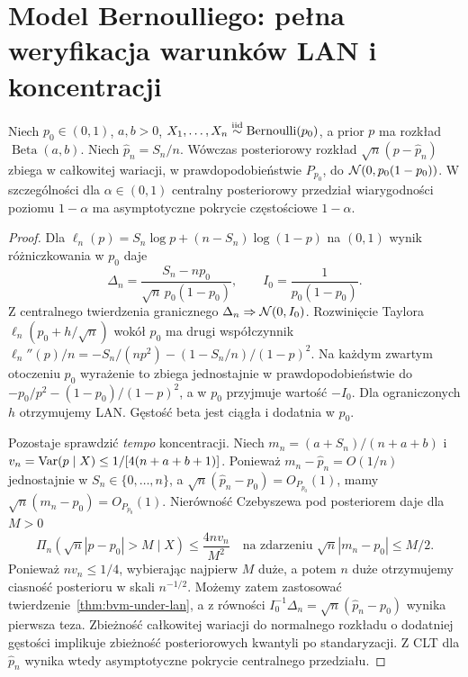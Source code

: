 \section{Model Bernoulliego: pełna weryfikacja warunków LAN i koncentracji}
\begin{twierdzenie}
\label{thm:bernoulli-bvm}
Niech $p_0\in(0,1)$, $a,b>0$,
$X_1,\ldots,X_n\mathrel{\overset{\mathrm{iid}}\sim}\operatorname{Bernoulli}(p_0)$,
a prior $p$ ma rozkład $\operatorname{Beta}(a,b)$.
Niech $\widehat p_n=S_n/n$. Wówczas posteriorowy rozkład
$\sqrt n(p-\widehat p_n)$ zbiega w całkowitej wariacji,
w prawdopodobieństwie $P_{p_0}$, do
$\mathcal N(0,p_0(1-p_0))$.
W szczególności dla $\alpha\in(0,1)$ centralny
posteriorowy przedział wiarygodności poziomu $1-\alpha$
ma asymptotyczne pokrycie częstościowe $1-\alpha$.
\end{twierdzenie}
\begin{proof}
Dla $\ell_n(p)=S_n\log p+(n-S_n)\log(1-p)$
na $(0,1)$ wynik różniczkowania w $p_0$ daje
\[
 \Delta_n=\frac{S_n-np_0}{\sqrt n\,p_0(1-p_0)},
 \qquad I_0=\frac1{p_0(1-p_0)}.
\]
Z centralnego twierdzenia granicznego
$\Delta_n\Rightarrow\mathcal N(0,I_0)$.
Rozwinięcie Taylora $\ell_n(p_0+h/\sqrt n)$ wokół $p_0$
ma drugi współczynnik
$\ell_n''(p)/n=-S_n/(np^2)-(1-S_n/n)/(1-p)^2$.
Na każdym zwartym otoczeniu $p_0$ wyrażenie to zbiega
jednostajnie w prawdopodobieństwie do
$-p_0/p^2-(1-p_0)/(1-p)^2$, a w $p_0$ przyjmuje
wartość $-I_0$. Dla ograniczonych $h$ otrzymujemy LAN.
Gęstość beta jest ciągła i dodatnia w $p_0$.

Pozostaje sprawdzić \emph{tempo} koncentracji.
Niech $m_n=(a+S_n)/(n+a+b)$ i
$v_n=\operatorname{Var}(p\mid X)\le1/[4(n+a+b+1)]$.
Ponieważ $m_n-\widehat p_n=O(1/n)$ jednostajnie
w $S_n\in\{0,\ldots,n\}$, a
$\sqrt n(\widehat p_n-p_0)=O_{P_{p_0}}(1)$,
mamy $\sqrt n(m_n-p_0)=O_{P_{p_0}}(1)$.
Nierówność Czebyszewa pod posteriorem daje dla $M>0$
\[
 \Pi_n(\sqrt n|p-p_0|>M\mid X)
 \le\frac{4nv_n}{M^2}
 \quad\text{na zdarzeniu }\sqrt n|m_n-p_0|\le M/2.
\]
Ponieważ $nv_n\le1/4$, wybierając najpierw $M$ duże,
a potem $n$ duże otrzymujemy ciasność posterioru
w skali $n^{-1/2}$. Możemy zatem zastosować
twierdzenie~\ref{thm:bvm-under-lan}, a z równości
$I_0^{-1}\Delta_n=\sqrt n(\widehat p_n-p_0)$
wynika pierwsza teza.
Zbieżność całkowitej wariacji do normalnego rozkładu
o dodatniej gęstości implikuje zbieżność posteriorowych
kwantyli po standaryzacji. Z CLT dla $\widehat p_n$
wynika wtedy asymptotyczne pokrycie centralnego
przedziału.
\end{proof}

